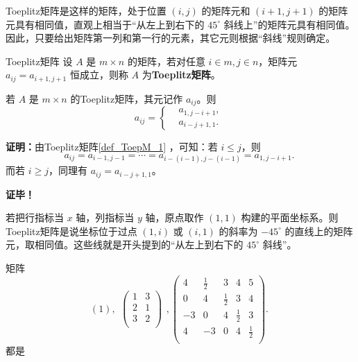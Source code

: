 

Toeplitz矩阵是这样的矩阵，处于位置 $(i,j)$ 的矩阵元和 $(i+1,j+1)$ 的矩阵元具有相同值，直观上相当于“从左上到右下的 $45^\circ$ 斜线上”的矩阵元具有相同值。因此，只要给出矩阵第一列和第一行的元素，其它元则根据“斜线”规则确定。

\begin{definition}{Toeplitz矩阵}\label{def_ToepM_1}
设 $A$ 是 $m\times n$ 的矩阵，若对任意 $i\in m,j\in n$，矩阵元 $a_{ij}=a_{i+1,j+1}$ 恒成立，则称 $A$ 为\textbf{Toeplitz矩阵}。
\end{definition}

\begin{theorem}{}
若 $A$ 是 $m\times n$ 的Toeplitz矩阵，其元记作 $a_{ij}$。则
\begin{equation}
a_{ij}=\left\{\begin{aligned}
&a_{1,j-i+1},\\
&a_{i-j+1,1}.
\end{aligned}\right.~
\end{equation}
\end{theorem}

\textbf{证明：}由Toeplitz矩阵\autoref{def_ToepM_1} ，可知：若 $i\leq j$，则
\begin{equation}
a_{ij}=a_{i-1,j-1}=\cdots=a_{i-(i-1),j-(i-1)}=a_{1,j-i+1}.~
\end{equation}
而若 $i\geq j$，同理有 $a_{ij}=a_{i-j+1,1}$。

\textbf{证毕！}

若把行指标当 $x$ 轴，列指标当 $y$ 轴，原点取作 $(1,1)$ 构建的平面坐标系。则Toeplitz矩阵是说坐标位于过点 $(1,i)$ 或 $(i,1)$ 的斜率为 $-45^\circ$ 的直线上的矩阵元，取相同值。这些线就是开头提到的“从左上到右下的 $45^\circ$ 斜线”。

\begin{example}{}
矩阵
\begin{equation}
(1),
\begin{aligned}
\left(
\begin{array}{cc}
 1 & 3 \\
 2 & 1 \\
 3 & 2 \\
\end{array}\right)
\end{aligned},
\left(
\begin{array}{ccccc}
 4 & \frac{1}{2} & 3 & 4 & 5 \\
 0 & 4 & \frac{1}{2} & 3 & 4 \\
 -3 & 0 & 4 & \frac{1}{2} & 3 \\
 4 & -3 & 0 & 4 & \frac{1}{2} \\
\end{array}
\right).~
\end{equation}
都是
\end{example}




